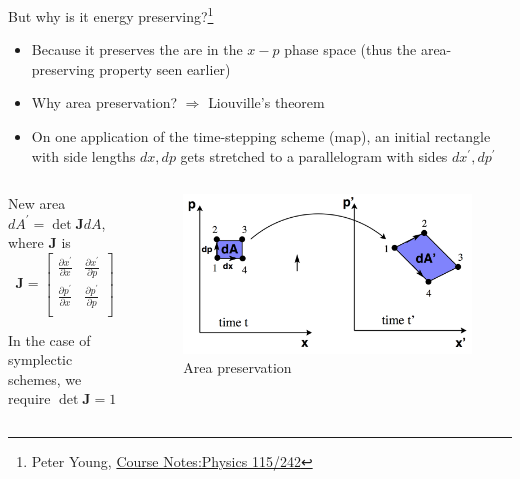 \documentclass[presentation]{beamer}
\newcommand{\bv}[1]{\ensuremath{\mathbf{#1}}}
\begin{document}
\begin{frame}[label={sec:org5fc63fe}]{But why is it energy preserving?\footnote{Peter Young, \href{https://young.physics.ucsc.edu/242/leapfrog.pdf}{Course Notes:Physics 115/242}}}
\begin{itemize}
\item Because it preserves the are in the \(x-p\) phase space (thus the area-preserving
property seen earlier)
\item Why area preservation? \(\Rightarrow\) \alert{Liouville's theorem}
\item On one application of the time-stepping scheme (map), an initial rectangle
with side lengths \(dx , dp\) gets stretched to a parallelogram with
sides \(dx^\prime, dp^\prime\)
\end{itemize}

\begin{columns}
\begin{column}{0.6\columnwidth}
New area \(dA^\prime = \det \bv{J} dA\), where \(\bv{J}\) is
\[ \bv{J} =	\begin{bmatrix}
	\frac{\partial x^\prime}{\partial x} & \frac{\partial x^\prime}{\partial p}  \\
	\frac{\partial p^\prime}{\partial x} & \frac{\partial p^\prime}{\partial p}  \\
	\end{bmatrix} \]

In the case of symplectic schemes, we require \(\det \bv{J} = 1\)
\end{column}
\begin{column}{0.4\columnwidth}
\begin{figure}[htbp]
\centering
\includegraphics[width=1.0\textwidth]{images/area_preserve.png}
\caption{Area preservation}
\end{figure}
\end{column}
\end{columns}
\end{frame}
\end{document}
